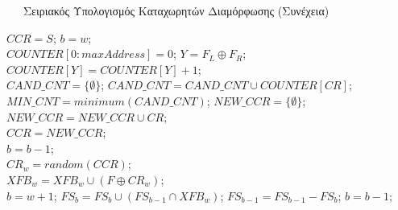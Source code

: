 \begin{algorithm}[H]
    \ContinuedFloat
    \caption{\ \ \ Σειριακός Υπολογισμός Καταχωρητών Διαμόρφωσης (Συνέχεια)}
    \begin{algorithmic}[1]
        \begin{footnotesize}
                \State {}
                    
                    \State $ CCR = S $;
                    \State $ b = w $;
                            \\
                            \State $ COUNTER\left[ 0 : maxAddress \right] = 0 $;
                                    \State $ Y = F_{L} \oplus F_{R} $;
                                    \State $ COUNTER\left[ Y \right] = COUNTER\left[ Y \right] + 1 $;
                                \EndFor
                            \EndFor
                            \\
                            \State $ CAND\_CNT = \{ \emptyset \} $;
                                \State $ CAND\_CNT = CAND\_CNT \cup COUNTER\left[ CR \right] $;
                            \EndFor
                            \\
                            \State $ MIN\_CNT = minimum(CAND\_CNT) $;
                            \State $ NEW\_CCR = \{ \emptyset \} $;
                                    \State $ NEW\_CCR = NEW\_CCR \cup CR $;
                                \EndIf
                            \EndFor
                            \\
                            \State $ CCR = NEW\_CCR $;
                            \\
                        \EndIf
                        \State $ b = b - 1 $;
                    \EndWhile
                    \\
                    \State $ CR_{w} = random(CCR) $;
                    \\
                        \State $ XFB_{w} = XFB_{w} \cup (F \oplus CR_{w}) $;
                    \EndFor
                    \\
                    \State $ b = w + 1 $;
                        \State $ FS_{b} = FS_{b} \cup (FS_{b-1} \cap XFB_{w}) $;
                        \State $ FS_{b-1} = FS_{b-1} - FS_{b} $;
                        \State $ b = b - 1 $;
                    \EndWhile
                    \\
                \EndFor
            \EndProcedure
        \end{footnotesize}
    \end{algorithmic}
\end{algorithm}
